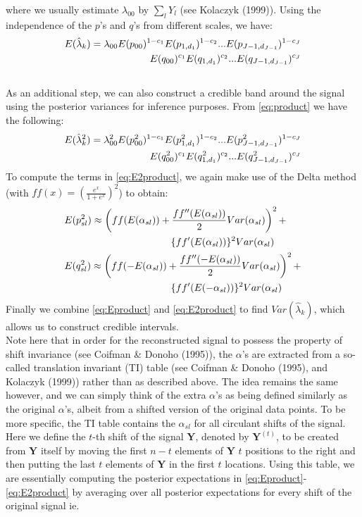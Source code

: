 \documentclass[12pt]{article}
\newcommand{\Ga}{\alpha}
\newcommand{\Gl}{\lambda}    \newcommand{\GL}{\Lambda}
\begin{document}
\begin{appendices}
where we usually estimate $\Gl_{00}$ by $\sum_l Y_l$ (see Kolaczyk (1999)). Using the independence of the $p$'s and $q$'s from different scales, we have:
\begin{eqnarray}\label{eq:Eproduct}E(\hat{\Gl}_k)=\Gl_{00}E(p_{00})^{1-c_1}E(p_{1,d_1})^{1-c_2}...E(p_{J-1,d_{J-1}})^{1-c_J}\notag\\
E(q_{00})^{c_1}E(q_{1,d_1})^{c_2}...E(q_{J-1,d_{J-1}})^{c_J}\end{eqnarray}
\bigskip\\
As an additional step, we can also construct a credible band around the signal using the posterior variances for inference purposes. From \eqref{eq:product} we have the following:
\begin{eqnarray}\label{eq:E2product}E(\hat{\Gl}_k^2)=\Gl_{00}^2E(p_{00}^2)^{1-c_1}E(p_{1,d_1}^2)^{1-c_2}...E(p_{J-1,d_{J-1}}^2)^{1-c_J}\notag\\
E(q_{00}^2)^{c_1}E(q_{1,d_1}^2)^{c_2}...E(q_{J-1,d_{J-1}}^2)^{c_J}\end{eqnarray}
To compute the terms in \eqref{eq:E2product}, we again make use of the Delta method (with $ff(x)=(\frac{e^x}{1+e^x})^2$) to obtain:
\begin{eqnarray}
&E(p_{sl}^2)\approx \left(ff(E(\Ga_{sl}))+\frac{ff''(E(\Ga_{sl}))}{2}Var(\Ga_{sl})\right)^2+\notag\\
& \hspace{1.5 in}\{ff'(E(\Ga_{sl}))\}^2Var(\Ga_{sl})\\
&E(q_{sl}^2)\approx \left(ff(-E(\Ga_{sl}))+\frac{ff''(-E(\Ga_{sl}))}{2}Var(\Ga_{sl})\right)^2+\notag\\
& \hspace{1.5 in}\{ff'(E(-\Ga_{sl}))\}^2Var(\Ga_{sl})
\end{eqnarray}
Finally we combine \eqref{eq:Eproduct} and \eqref{eq:E2product} to find $Var(\hat{\Gl}_k)$, which allows us to construct credible intervals.\bigskip\\
Note here that in order for the reconstructed signal to possess the property of shift invariance (see Coifman \& Donoho (1995)), the $\Ga$'s are extracted from a so-called translation invariant (TI) table (see Coifman \& Donoho (1995), and Kolaczyk (1999)) rather than as described above. The idea remains the same however, and we can simply think of the extra $\Ga$'s as being defined similarly as the original $\Ga$'s, albeit from a shifted version of the original data points. To be more specific, the TI table contains the $\Ga_{sl}$ for all circulant shifts of the signal. Here we define the $t$-th shift of the signal $\bm{Y}$, denoted by $\bm{Y}^{(t)}$, to be created from $\bm{Y}$ itself by moving the first $n-t$ elements of $\bm{Y}$ $t$ positions to the right and then putting the last $t$ elements of $\bm{Y}$ in the first $t$ locations. Using this table, we are essentially computing the posterior expectations in \eqref{eq:Eproduct}-\eqref{eq:E2product} by averaging over all posterior expectations for every shift of the original signal ie.

\end{appendices}
\end{document}
